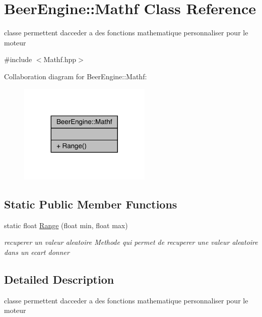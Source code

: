 \hypertarget{class_beer_engine_1_1_mathf}{}\section{Beer\+Engine\+:\+:Mathf Class Reference}
\label{class_beer_engine_1_1_mathf}


classe permettent d\textquotesingle{}acceder a des fonctions mathematique personnaliser pour le moteur  




{\ttfamily \#include $<$Mathf.\+hpp$>$}



Collaboration diagram for Beer\+Engine\+:\+:Mathf\+:\nopagebreak
\begin{figure}[H]
\begin{center}
\leavevmode
\includegraphics[width=179pt]{class_beer_engine_1_1_mathf__coll__graph}
\end{center}
\end{figure}
\subsection*{Static Public Member Functions}
\begin{DoxyCompactItemize}
\item 
static float \mbox{\hyperlink{class_beer_engine_1_1_mathf_a857806a2b256303e5a737c6143e35454}{Range}} (float min, float max)
\begin{DoxyCompactList}\small\item\em recuperer un valeur aleatoire Methode qui permet de recuperer une valeur aleatoire dans un ecart donner \end{DoxyCompactList}\end{DoxyCompactItemize}


\subsection{Detailed Description}
classe permettent d\textquotesingle{}acceder a des fonctions mathematique personnaliser pour le moteur 

